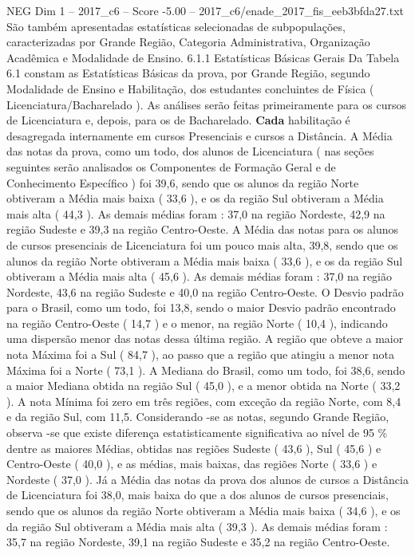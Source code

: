 \begin{textsample}{NEG Dim 1 – 2017\_c6 – Score -5.00 – 2017\_c6/enade\_2017\_fis\_eeb3bfda27.txt}
São também apresentadas estatísticas selecionadas de subpopulações, caracterizadas por Grande Região, Categoria Administrativa, Organização Acadêmica e Modalidade de Ensino. 6.1.1 Estatísticas Básicas Gerais Da Tabela 6.1 constam as Estatísticas Básicas da prova, por Grande Região, segundo Modalidade de Ensino e Habilitação, dos estudantes concluintes de Física ( Licenciatura/Bacharelado ).
As análises serão feitas primeiramente para os cursos de Licenciatura e, depois, para os de Bacharelado. \textbf{Cada} habilitação é desagregada internamente em cursos Presenciais e cursos a Distância.
A Média das notas da prova, como um todo, dos alunos de Licenciatura ( nas seções seguintes serão analisados os Componentes de Formação Geral e de Conhecimento Específico ) foi 39,6, sendo que os alunos da região Norte obtiveram a Média mais baixa ( 33,6 ), e os da região Sul obtiveram a Média mais alta ( 44,3 ).
As demais médias foram : 37,0 na região Nordeste, 42,9 na região Sudeste e 39,3 na região Centro-Oeste.
A Média das notas para os alunos de cursos presenciais de Licenciatura foi um pouco mais alta, 39,8, sendo que os alunos da região Norte obtiveram a Média mais baixa ( 33,6 ), e os da região Sul obtiveram a Média mais alta ( 45,6 ).
As demais médias foram : 37,0 na região Nordeste, 43,6 na região Sudeste e 40,0 na região Centro-Oeste.
O Desvio padrão para o Brasil, como um todo, foi 13,8, sendo o maior Desvio padrão encontrado na região Centro-Oeste ( 14,7 ) e o menor, na região Norte ( 10,4 ), indicando uma dispersão menor das notas dessa última região.
A região que obteve a maior nota Máxima foi a Sul ( 84,7 ), ao passo que a região que atingiu a menor nota Máxima foi a Norte ( 73,1 ).
A Mediana do Brasil, como um todo, foi 38,6, sendo a maior Mediana obtida na região Sul ( 45,0 ), e a menor obtida na Norte ( 33,2 ).
A nota Mínima foi zero em três regiões, com exceção da região Norte, com 8,4 e da região Sul, com 11,5.
Considerando -se as notas, segundo Grande Região, observa -se que existe diferença estatisticamente significativa ao nível de 95 \% dentre as maiores Médias, obtidas nas regiões Sudeste ( 43,6 ), Sul ( 45,6 ) e Centro-Oeste ( 40,0 ), e as médias, mais baixas, das regiões Norte ( 33,6 ) e Nordeste ( 37,0 ).
Já a Média das notas da prova dos alunos de cursos a Distância de Licenciatura foi 38,0, mais baixa do que a dos alunos de cursos presenciais, sendo que os alunos da região Norte obtiveram a Média mais baixa ( 34,6 ), e os da região Sul obtiveram a Média mais alta ( 39,3 ).
As demais médias foram : 35,7 na região Nordeste, 39,1 na região Sudeste e 35,2 na região Centro-Oeste.

\end{textsample}

